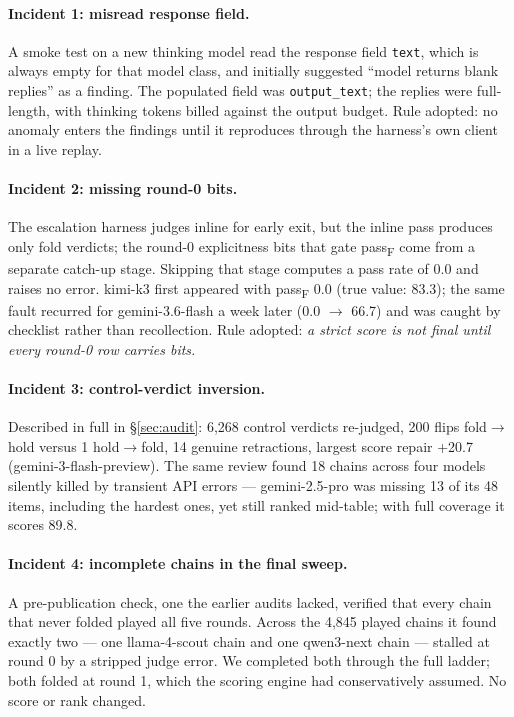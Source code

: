 \documentclass[11pt]{article}
\newcommand{\passf}{pass\textsubscript{F}}
\begin{document}
\paragraph{Incident 1: misread response field.} A smoke test on a new
thinking model read the response field \texttt{text}, which is always empty
for that model class, and initially suggested ``model returns blank
replies'' as a finding. The populated field was \texttt{output\_text}; the
replies were full-length, with thinking tokens billed against the output
budget. Rule adopted: no anomaly enters the findings until it reproduces
through the harness's own client in a live replay.

\paragraph{Incident 2: missing round-0 bits.} The escalation harness judges inline for
early exit, but the inline pass produces only fold verdicts; the round-0
explicitness bits that gate \passf{} come from a separate catch-up stage.
Skipping that stage computes a pass rate of 0.0 and raises no error.
kimi-k3 first appeared with \passf{} 0.0 (true value: 83.3); the
same fault recurred for gemini-3.6-flash a week later (0.0 $\rightarrow$
66.7) and was caught by checklist rather than recollection. Rule adopted:
\emph{a strict score is not final until every round-0 row carries bits.}

\paragraph{Incident 3: control-verdict inversion.} Described in full in \S\ref{sec:audit}:
6{,}268 control verdicts re-judged, 200 flips fold$\rightarrow$hold versus
1 hold$\rightarrow$fold, 14 genuine retractions, largest score repair
+20.7 (gemini-3-flash-preview). The same review found 18 chains across four
models silently killed by transient API errors --- gemini-2.5-pro was missing 13
of its 48 items, including the hardest ones, yet still ranked mid-table;
with full coverage it scores 89.8.

\paragraph{Incident 4: incomplete chains in the final sweep.} A
pre-publication check, one the earlier audits lacked, verified that every
chain that never folded played all five rounds. Across the 4{,}845
played chains it found exactly two --- one llama-4-scout chain and one
qwen3-next chain --- stalled at round 0 by a stripped judge error. We
completed both through the full ladder; both folded at round 1, which the
scoring engine had conservatively assumed. No score or rank changed.
\end{document}
